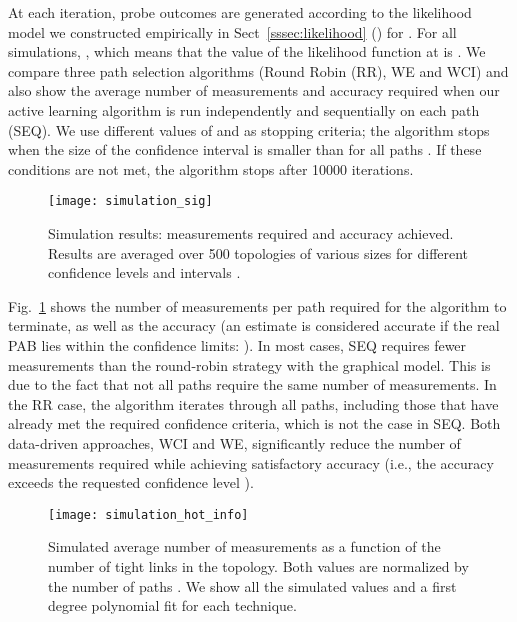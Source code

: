 \documentclass[final,5p,times,twocolumn]{elsarticle}
\begin{document}
At each iteration, probe outcomes are generated according to the likelihood model we constructed empirically in Sect~\ref{sssec:likelihood} () for . For all simulations, , which means that the value of the likelihood function at  is .  We compare three path selection algorithms (Round Robin (RR), WE and WCI) and also show the average number of measurements and accuracy required when our active learning algorithm is run independently and sequentially on each path (SEQ).  We use different values of  and  as stopping criteria; the algorithm stops when the size of the confidence interval  is smaller than  for all paths .  If these conditions are not met, the algorithm stops after 10000 iterations. 

\begin{figure}[!t]
	\centering
	\texttt{[image: simulation\_sig]}
	\caption{Simulation results: measurements required and accuracy achieved. Results are averaged over 500 topologies of various sizes for different confidence levels  and intervals .}
	\label{fig:simulation_sig}
\end{figure}

Fig.~\ref{fig:simulation_sig} shows the number of measurements per path required for the algorithm to terminate, as well as the accuracy (an estimate is considered accurate if the real PAB lies within the confidence limits: ).  In most cases, SEQ requires fewer measurements than the round-robin strategy with the graphical model.  This is due to the fact that not all paths require the same number of measurements.  In the RR case, the algorithm iterates through all paths, including those that have already met the required confidence criteria, which is not the case in SEQ.  Both data-driven approaches, WCI and WE, significantly reduce the number of measurements required while achieving satisfactory accuracy (i.e., the accuracy exceeds the requested confidence level ).

\begin{figure}[!h]
	\centering
	\texttt{[image: simulation\_hot\_info]}
	\caption{Simulated average number of measurements as a function of the number of tight links in the topology.  Both values are normalized by the number of paths .  We show all the simulated values and a first degree polynomial fit for each technique.}
	\label{fig:simulation_info}
\end{figure}
\end{document}

